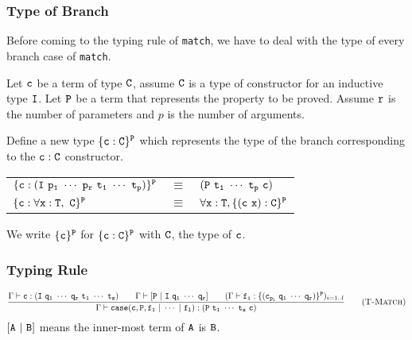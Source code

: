 \subsubsection{Type of Branch}
Before coming to the typing rule of {\tt match}, we have to deal with the type of every branch case of {\tt match}.\par
Let $\tt c$ be a term of type $\tt C$, assume $\tt C$ is a type of constructor for an inductive type $\tt I$. Let
$\tt P$ be a term that represents the property to be proved. Assume $\tt r$ is the number of parameters and 
$p$ is the number of arguments.\par
Define a new type $\tt \{c:C\}^P$ which represents the type of the branch corresponding to the $\tt c:C$ constructor.
\begin{center}
\begin{tabular}{lcl}
$\tt \{c:(I\ p_1\ \cdots\ p_r\ t_1\ \cdots\ t_p)\}^P$ & $\equiv$ & $\tt (P\ t_1\ \cdots\ t_p\ c)$\\
$\tt \{c:\forall x:T,\ C\}^P$ & $\equiv$ & $\tt \forall x:T, \{(c\ x):C\}^P$
\end{tabular}
\end{center}
We write $\tt\{c\}^P$ for $\tt\{c:C\}^P$ with $\tt C$, the type of $\tt c$.

\subsubsection{Typing Rule}
\begin{equation*}
\frac{\Gamma\vdash{\tt c:(I\ q_1\ \cdots\ q_r\ t_1\ \cdots\ t_s)}\qquad 
        \Gamma\vdash{\tt [P\ |\ I\ q_1\ \cdots\ q_r]}\qquad
    (\Gamma\vdash{\tt f_i:\{(c_{p_i}\ q_1\ \cdots\ q_r)\}^P})_{i=1..l}}
    {\Gamma\vdash{\tt case(c,P,f_1\ |\ \cdots\ |\ f_l):(P\ t_1\ \cdots\ t_s\ c)}}
    \tag{\sc T-Match}
\end{equation*}
$\tt [A\ |\ B]$ means the inner-most term of $\tt A$ is $\tt B$.
